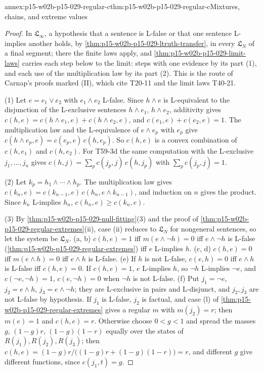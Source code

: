 \begin{annexitem}{annex:p15-w02b-p15-029-regular-c}{thm:p15-w02b-p15-029-regular-c}{Mixtures, chains, and extreme values}
\begin{proof}
In \(\mathfrak L_\infty\), a hypothesis that a sentence is L-false or
that one sentence L-implies another holds, by
\cref{thm:p15-w02b-p15-029-ltruth-transfer}, in every \(\mathfrak L_N\)
of a final segment; there the finite laws apply, and
\cref{thm:p15-w02b-p15-029-limit-laws} carries each step below to the
limit: steps with one evidence by its part (1), and each use of the
multiplication law by its part (2). This is the route of Carnap's
proofs marked (II), which cite T20-11 and the limit laws T40-21.

(1) Let \(e=e_1\lor e_2\) with \(e_1\land e_2\) L-false. Since
\(h\land e\) is L-equivalent to the disjunction of the L-exclusive
sentences \(h\land e_1\), \(h\land e_2\), additivity gives
\(c(h,e)=c(h\land e_1,e)+c(h\land e_2,e)\), and
\(c(e_1,e)+c(e_2,e)=1\). The multiplication law and the L-equivalence
of \(e\land e_p\) with \(e_p\) give
\(c(h\land e_p,e)=c(e_p,e)\,c(h,e_p)\). So \(c(h,e)\) is a convex
combination of \(c(h,e_1)\) and \(c(h,e_2)\). For T59-3d the same
computation with the L-exclusive \(j_1,\ldots,j_n\) gives
\(c(h,j)=\sum_pc(j_p,j)\,c(h,j_p)\) with \(\sum_pc(j_p,j)=1\).

(2) Let \(k_p=h_1\land\cdots\land h_p\). The multiplication law gives
\(c(k_n,e)=c(k_{n-1},e)\,c(h_n,e\land k_{n-1})\), and induction on
\(n\) gives the product. Since \(k_n\) L-implies \(h_n\),
\(c(h_n,e)\geq c(k_n,e)\).

(3) By \cref{thm:p15-w02b-p15-029-null-fitting}(3) and the proof of
\cref{thm:p15-w02b-p15-029-regular-extremes}(ii), case (ii) reduces to
\(\mathfrak L_N\) for nongeneral sentences, so let the system be
\(\mathfrak L_N\). (a, b) \(c(h,e)=1\) iff \(m(e\land\neg h)=0\) iff
\(e\land\neg h\) is L-false (\cref{thm:p15-w02b-p15-029-regular-extremes})
iff \(e\) L-implies \(h\). (c, d) \(c(h,e)=0\) iff \(m(e\land h)=0\)
iff \(e\land h\) is L-false. (e) If \(h\) is not L-false,
\(c(e,h)=0\) iff \(e\land h\) is L-false iff \(c(h,e)=0\). If
\(c(h,e)=1\), \(e\) L-implies \(h\), so \(\neg h\) L-implies
\(\neg e\), and \(c(\neg e,\neg h)=1\), \(c(e,\neg h)=0\) when
\(\neg h\) is not L-false. (f) Put \(j_1=\neg e\), \(j_2=e\land h\),
\(j_3=e\land\neg h\); they are L-exclusive in pairs and L-disjunct,
and \(j_2,j_3\) are not L-false by hypothesis. If \(j_1\) is L-false,
\(j_2\) is factual, and case (l) of
\cref{thm:p15-w02b-p15-029-regular-extremes} gives a regular \(m\) with
\(m(j_2)=r\); then \(m(e)=1\) and \(c(h,e)=r\). Otherwise choose
\(0<g<1\) and spread the masses \(g\), \((1-g)r\), \((1-g)(1-r)\)
equally over the states of \(R(j_1),R(j_2),R(j_3)\); then
\(c(h,e)=(1-g)r/\bigl((1-g)r+(1-g)(1-r)\bigr)=r\), and different
\(g\) give different functions, since \(c(j_1,t)=g\).


\end{proof}
\end{annexitem}
